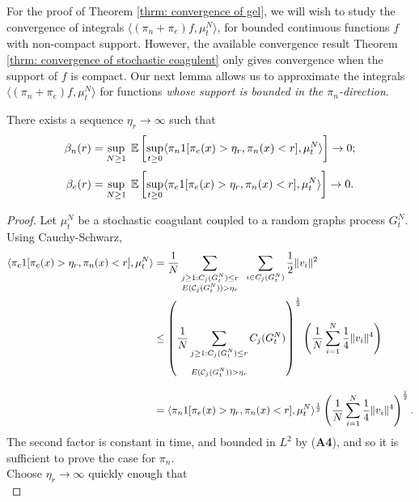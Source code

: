 For the proof of Theorem \ref{thrm: convergence of gel}, we will wish to study the convergence of integrals $\langle (\pi_n+\pi_e)f, \mu^N_t\rangle$, for bounded continuous functions $f$ with non-compact support. However, the available convergence result Theorem \ref{thrm: convergence of stochastic coagulent} only gives convergence when the support of $f$ is compact. Our next lemma allows us to approximate the integrals $\langle (\pi_n+\pi_e)f, \mu^N_t\rangle$ for functions \emph{whose support is bounded in the $\pi_n$-direction}. \begin{lemma}\label{lemma: etar} There exists a sequence $\eta_r \rightarrow \infty$ such that \begin{equation}
    \beta_n(r)=\sup_{N\geq 1} \hspace{0.1cm} \mathbb{E}\left[\sup_{t\geq 0}\langle \pi_n 1[\pi_e(x)>\eta_r, \pi_n(x)< r], \mu^N_t\rangle \right]\rightarrow 0;
\end{equation} \begin{equation}
    \beta_e(r)= \sup_{N\geq 1} \hspace{0.1cm} \mathbb{E}\left[\sup_{t\geq 0}\langle \pi_e 1[\pi_e(x)>\eta_r, \pi_n(x)< r], \mu^N_t\rangle\right] \rightarrow 0. 
\end{equation} \end{lemma} \begin{proof} Let $\mu^N_t$ be a stochastic coagulant coupled to a random graphs process $G^N_t$. Using Cauchy-Schwarz, \begin{equation} \begin{split}
   \langle \pi_e 1[\pi_e(x)>\eta_r, \pi_n(x)< r], \mu^N_t\rangle & = \frac{1}{N} \sum_{\substack{j\geq 1: C_j(G^N_t)\le r \\ E(\mathcal{C}_j(G^N_t))>\eta_r}} \hspace{0.2cm} \sum_{i\in C_j(G^N_t)} \frac{1}{2}\|v_i\|^2  \\ & \leq \left(\frac{1}{N} \sum_{\substack{j\geq 1: C_j(G^N_t)\le r \\[2ex] E(\mathcal{C}_j(G^N_t))>\eta_r}} C_j(G^N_t)\right)^\frac{1}{2}\left(\frac{1}{N}\sum_{i=1}^N \frac{1}{4}\|v_i\|^4\right)  \\[2ex] & = \langle \pi_n 1[\pi_e(x)>\eta_r, \pi_n(x)< r], \mu^N_t\rangle^\frac{1}{2}\left(\frac{1}{N}\sum_{i=1}^N \frac{1}{4}\|v_i\|^4\right)^\frac{1}{2}.
\end{split} \end{equation} The second factor is constant in time, and bounded in $L^2$ by (\textbf{A4}), and so it is sufficient to prove the case for $\pi_n$. \medskip \\ Choose $\eta_r\rightarrow \infty$ quickly enough that \begin{equation} \label{eq: choice of etar}

\end{equation}
\end{proof}
